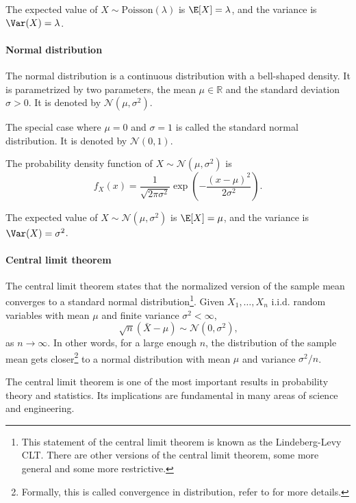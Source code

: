 The expected value of $X \sim \text{Poisson}(\lambda)$ is $\E[X] = \lambda$, and the
variance is $\Var(X) = \lambda$.

\paragraph{Normal distribution} The normal distribution is a continuous distribution
with a bell-shaped density.  It is parametrized by two parameters, the mean $\mu \in
\mathbb{R}$ and the standard deviation $\sigma > 0$.  It is denoted by
$\mathcal{N}(\mu, \sigma^2)$.

The special case where $\mu = 0$ and $\sigma = 1$ is called the standard normal
distribution.  It is denoted by $\mathcal{N}(0, 1)$.

The probability density function of $X \sim \mathcal{N}(\mu, \sigma^2)$ is
\begin{equation}
  \label{eq:normal}
  f_X(x) = \frac{1}{\sqrt{2 \pi \sigma^2}} \exp\left(-\frac{(x - \mu)^2}{2 \sigma^2}\right)\text{.}
\end{equation}

The expected value of $X \sim \mathcal{N}(\mu, \sigma^2)$ is $\E[X] = \mu$, and the
variance is $\Var(X) = \sigma^2$.

\paragraph{Central limit theorem}  The central limit theorem states that the normalized
version of the sample mean converges to a standard normal distribution\footnote{This
statement of the central limit theorem is known as the Lindeberg-Levy CLT.  There are
other versions of the central limit theorem, some more general and some more
restrictive.}. Given $X_1, \dots, X_n$ i.i.d. random variables with mean $\mu$ and finite
variance $\sigma^2 < \infty$,
\begin{equation*}
  \sqrt{n} (\bar{X} - \mu) \sim \mathcal{N}(0, \sigma^2)\text{,}
\end{equation*}
as $n \rightarrow \infty$.  In other words, for a large enough $n$, the distribution of
the sample mean gets closer\footnote{Formally, this is called convergence in distribution,
refer to  for more details.} to a normal distribution with mean
$\mu$ and variance $\sigma^2/n$.

The central limit theorem is one of the most important results in probability theory and
statistics.  Its implications are fundamental in many areas of science and engineering.

